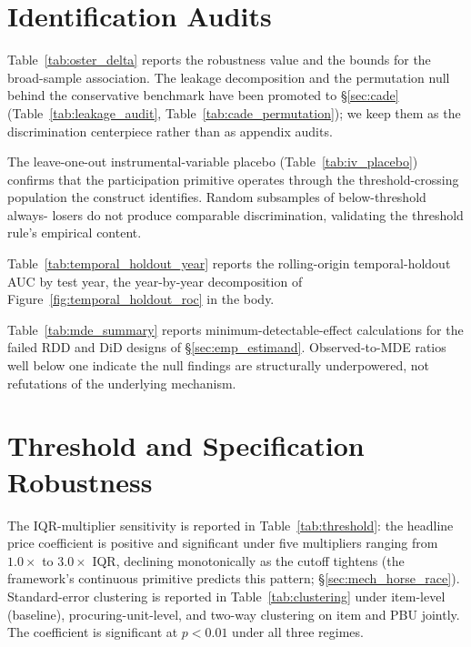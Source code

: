 \section{Identification Audits}
\label{app:online_robustness}

Table~\ref{tab:oster_delta} reports the
\citet{cinelli2020making} robustness value and the
\citet{oster2019unobservable} bounds for the broad-sample
association. The leakage decomposition and the permutation
null behind the conservative benchmark have been promoted to
\S\ref{sec:cade} (Table~\ref{tab:leakage_audit},
Table~\ref{tab:cade_permutation}); we keep them as the
discrimination centerpiece rather than as appendix audits.

The leave-one-out instrumental-variable placebo
(Table~\ref{tab:iv_placebo}) confirms that the participation
primitive operates through the threshold-crossing population the
construct identifies. Random subsamples of below-threshold always-
losers do not produce comparable discrimination, validating the
threshold rule's empirical content.

Table~\ref{tab:temporal_holdout_year} reports the rolling-origin
temporal-holdout AUC by test year, the year-by-year decomposition
of Figure~\ref{fig:temporal_holdout_roc} in the body.

Table~\ref{tab:mde_summary} reports minimum-detectable-effect
calculations for the failed RDD and DiD designs of
\S\ref{sec:emp_estimand}. Observed-to-MDE ratios well below one
indicate the null findings are structurally underpowered, not
refutations of the underlying mechanism.









\section{Threshold and Specification Robustness}
\label{app:robustness_tables}

The IQR-multiplier sensitivity is reported in
Table~\ref{tab:threshold}: the headline price coefficient is
positive and significant under five multipliers ranging from
$1.0\!\times$ to $3.0\!\times$ IQR, declining monotonically as
the cutoff tightens (the framework's continuous primitive
predicts this pattern; §\ref{sec:mech_horse_race}). Standard-error
clustering is reported in Table~\ref{tab:clustering} under
item-level (baseline), procuring-unit-level, and two-way
\citet{cameron2011robust} clustering on item and PBU jointly.
The coefficient is significant at $p<0.01$ under all three
regimes.

